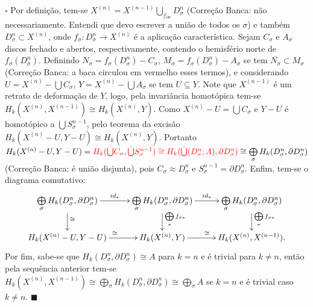 \documentclass[12pt]{book}
\newenvironment{prova}[1]{$\square$ #1}{\hfill$\blacksquare$}
\newcommand{\celula}[2]{D^{#1}_{#2}}
\newcommand{\celulabordo}[2]{\partial D^{#1}_{#2}}
\newcommand{\homologia}[2]{H_{#1}(#2;A)}
\newcommand{\homologiarel}[3]{H_{#1}(#2,#3)}
\newcommand{\homologiarelcel}[3]{H_{#1}(D^{#2}_{#3}, \partial D^{#2}_{#3})}
\newcommand{\homologiarelskelesimpl}[2]{H_{#1}(X^{(#2)}, X^{(#2-1)})}
\newcommand{\somadir}[1]{\bigoplus \limits_{#1}}
\newcommand{\skeleton}[1]{X^{(#1)}}
\newcommand{\alerta}[1]{{\color{red}#1}}
\newcommand{\correcaobanca}[1]{\alerta{(Correção Banca: #1)}}
\begin{document}
	\begin{prova}
		Por definição, tem-se \alerta{ $\skeleton{n} = \skeleton{n-1}\bigcup_{f_{\partial \sigma} } \celula{n}{\sigma}$ } \correcaobanca{não necessariamente. Entendi que devo escrever a união de todos os $\sigma$} e também $\celula{n}{\sigma} \subset \skeleton{n}$, onde $f_{\sigma}:\celula{n}{\sigma} \to \skeleton{n}$ é a aplicação característica. Sejam $C_{\sigma}$ e $A_{\sigma}$ discos fechado e abertos, respectivamente, contendo o hemisfério norte de $f_{\sigma}(\celula{n}{\sigma})$. Definindo $N_{\sigma} = f_{\sigma}(\celula{n}{\sigma}) - C_{\sigma}$, $M_{\sigma} = f_{\sigma}(\celula{n}{\sigma}) - A_{\sigma}$ se tem \alerta{$\overline{N_{\sigma}} \subset M_{\sigma}$ } \correcaobanca{a baca circulou em vermelho esses termos}, e considerando $U = \skeleton{n} - \bigcup C_{\sigma}$, $Y = \skeleton{n} - \bigcup A_{\sigma}$ se tem $U \subseteq Y$. Note que $\skeleton{n-1}$ é um retrato de deformação de $Y$, logo, pela invariância homotópica tem-se $\homologiarel{k}{\skeleton{n}}{\skeleton{n-1}} \cong  \homologiarel{k}{\skeleton{n}}{Y}$. Como $\skeleton{n} - U = \bigcup C_{\sigma}$ e $Y - U $ é homotópico a $\bigcup S^{n-1}_{\sigma}$, pelo teorema da excisão $\homologiarel{k}{\skeleton{n} - U}{Y- U} \cong \homologiarel{k}{\skeleton{n}}{Y}$. Portanto $\homologiarel{k}{\skeleton{n} - U}{Y- U} = \alerta{\homologiarel{k}{\dot{\bigcup }C_{\sigma}}{\dot{\bigcup }S^{n-1}_{\sigma}} \cong \homologia{k}{\dot{\bigcup }(\celula{n}{\sigma}}, \celulabordo{n}{\sigma})} \cong \somadir{\sigma} \homologiarelcel{k}{n}{\sigma}$ \correcaobanca{é união disjunta}, pois $C_{\sigma} \approx \celula{n}{\sigma}$ e $S^{n-1}_{\sigma} = \celulabordo{n}{\sigma}$. Enfim, tem-se o diagrama comutativo:
		\[
		\xymatrix{
			\somadir{\sigma} \homologiarelcel{k}{n}{\sigma} \ar[r]^{id_{*}} \ar[d]^{\cong} & 
			\somadir{\sigma} \homologiarelcel{k}{n}{\sigma} \ar[r]^{id_{*}} \ar[d]^{\somadir{\sigma}f_{\sigma*}} & 
			\somadir{\sigma} \homologiarelcel{k}{n}{\sigma} \ar[d]^{\somadir{\sigma}f_{\sigma*}} 
			\\
			\homologiarel{k}{\skeleton{n} - U}{Y- U} \ar[r]^{\cong} & \homologiarel{k}{\skeleton{n}}{Y} \ar[r]^{\cong} & 
			\homologiarelskelesimpl{k}{n}.
		}
		\]
		Por fim, sabe-se que $\homologiarelcel{k}{n}{\sigma} \cong A$ para $k=n$ e é trivial para $k\neq n$, então pela sequência anterior tem-se $\homologiarelskelesimpl{k}{n} \cong \somadir{\sigma}\homologiarelcel{k}{n}{\sigma} \cong \somadir{\sigma} A$ se $k=n$ e é trivial caso $k\neq n$.
	\end{prova} 
	
\end{document}

